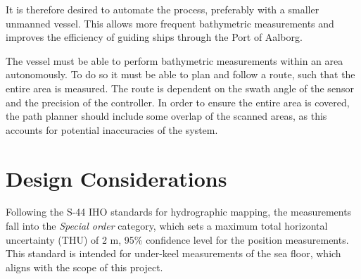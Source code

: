 It is therefore desired to automate the process, preferably with a smaller unmanned vessel. This allows more frequent bathymetric measurements and improves the efficiency of guiding ships through the Port of Aalborg.

The vessel must be able to perform bathymetric measurements within an area autonomously. 
To do so it must be able to plan and follow a route, such that the entire area is measured. 
The route is dependent on the swath angle of the sensor and the precision of the controller. In order to ensure the entire area is covered, the path planner should include some overlap of the scanned areas, as this accounts for potential inaccuracies of the system.








\section{Design Considerations}\label{sec:designconsiderations}
Following the S-44 IHO standards for hydrographic mapping, the measurements fall into the \emph{Special order} category, which sets a maximum total horizontal uncertainty (THU) of 2 m, 95\% confidence level for the position measurements. 
This standard is intended for under-keel measurements of the sea floor, which aligns with the scope of this project. \cite{IHO-S-44}

